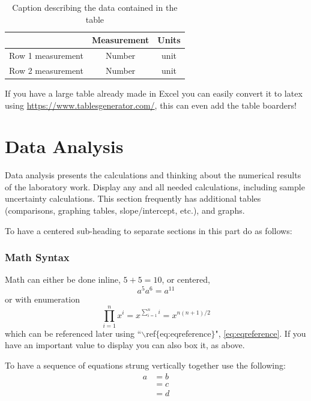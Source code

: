 \documentclass{article}%
\begin{document}
\bgroup
\def\arraystretch{1.5}
\begin{table}[H]
    \centering
    \caption{Caption describing the data contained in the table}
    \begin{tabular}{|c|c|c|}
    \hline
         & Measurement & Units \\ \hline
        Row 1 measurement & Number & unit \\ \hline
        Row 2 measurement & Number & unit \\ \hline
    \end{tabular}
    \label{tab:table2Reference}
\end{table}
\egroup

\noindent If you have a large table already made in Excel you can easily convert it to latex using \url{https://www.tablesgenerator.com/}, this can even add the table boarders! 

\section{Data Analysis}

Data analysis presents the calculations and thinking about the numerical results of the laboratory work. Display any and all needed calculations, including sample uncertainty calculations. This section frequently has  additional tables (comparisons, graphing tables, slope/intercept, etc.), and graphs.

To have a centered sub-heading to separate sections in this part do as follows:

\begin{centering}
    \subsubsection*{Math Syntax}
\end{centering}

Math can either be done inline, $5+5=10$, or centered, \begin{equation*}
    a^5a^6 = a^{11}
\end{equation*}
or with enumeration \begin{equation}\label{eq:eqreference}
    \boxed{\prod_{i=1}^nx^i = x^{\sum_{i=1}^ni} = x^{n(n+1)/2}}
\end{equation}
which can be referenced later using ``$\backslash$ref$\{$eq:eqreference$\}$", \ref{eq:eqreference}. If you have an important value to display you can also box it, as above.

To have a sequence of equations strung vertically together use the following:
\begin{align*}
    a &= b \\
    &= c \\
    &= d
\end{align*}
\end{document}
